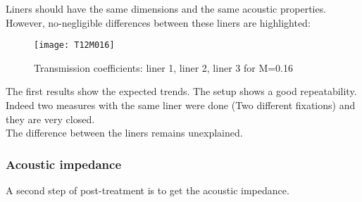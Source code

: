 Liners should have the same dimensions and the same acoustic properties. However, no-negligible differences between these liners are highlighted:
\begin{figure}[H] \centering
    \texttt{[image: T12M016]}
    \caption{Transmission coefficients: liner 1, liner 2, liner 3 for M=0.16 }
\end{figure}
The first results show the expected trends. The setup shows a good repeatability. Indeed two measures with the same liner were done (Two different fixations) and they are very closed.\\
The difference between the liners remains unexplained.
\subsubsection{Acoustic impedance}
A second step of post-treatment is to get the acoustic impedance.

\clearpage